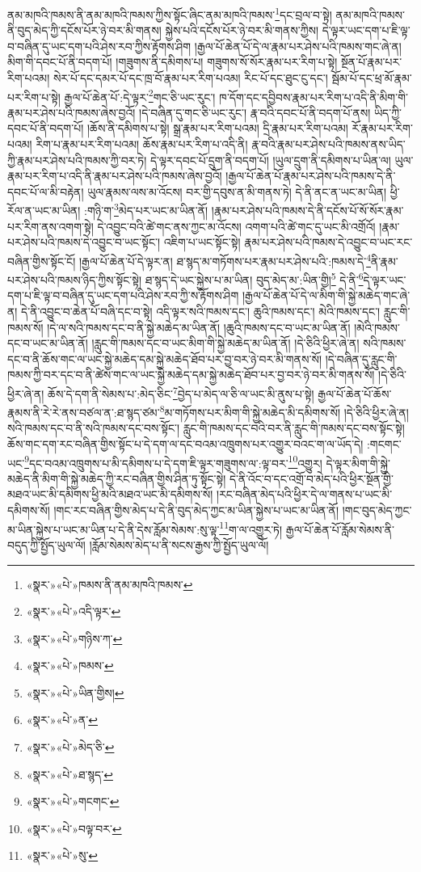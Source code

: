 ནམ་མཁའི་ཁམས་ནི་ནམ་མཁའི་ཁམས་ཀྱིས་སྟོང་ཞིང་ནམ་མཁའི་ཁམས་\footnote{«སྣར་»«པེ་»ཁམས་ནི་ནམ་མཁའི་ཁམས་}དང་བྲལ་བ་སྟེ། ནམ་མཁའི་ཁམས་ནི་བུད་མེད་ཀྱི་དངོས་པོར་ཉེ་བར་མི་གནས། སྐྱེས་པའི་དངོས་པོར་ཉེ་བར་མི་གནས་ཀྱིས། དེ་ལྟར་ཡང་དག་པ་ཇི་ལྟ་བ་བཞིན་དུ་ཡང་དག་པའི་ཤེས་རབ་ཀྱིས་རྟོགས་ཤིག །རྒྱལ་པོ་ཆེན་པོ་དེ་ལ་རྣམ་པར་ཤེས་པའི་ཁམས་གང་ཞེ་ན། མིག་གི་དབང་པོ་ནི་བདག་པོ། །གཟུགས་ནི་དམིགས་པ། གཟུགས་སོ་སོར་རྣམ་པར་རིག་པ་སྟེ། སྔོན་པོ་རྣམ་པར་རིག་པའམ། སེར་པོ་དང་དམར་པོ་དང་ཁྲ་བོ་རྣམ་པར་རིག་པའམ། རིང་པོ་དང་ཐུང་ངུ་དང་། སྦོམ་པོ་དང་ཕྲ་མོ་རྣམ་པར་རིག་པ་སྟེ། རྒྱལ་པོ་ཆེན་པོ་:དེ་ལྟར་\footnote{«སྣར་»«པེ་»འདི་ལྟར་}གང་ཅི་ཡང་རུང་། ཁ་དོག་དང་དབྱིབས་རྣམ་པར་རིག་པ་འདི་ནི་མིག་གི་རྣམ་པར་ཤེས་པའི་ཁམས་ཞེས་བྱའོ། །དེ་བཞིན་དུ་གང་ཅི་ཡང་རུང་། རྣ་བའི་དབང་པོ་ནི་བདག་པོ་ནས། ཡིད་ཀྱི་དབང་པོ་ནི་བདག་པོ། །ཆོས་ནི་དམིགས་པ་སྟེ། སྒྲ་རྣམ་པར་རིག་པའམ། དྲི་རྣམ་པར་རིག་པའམ། རོ་རྣམ་པར་རིག་པའམ། རིག་པ་རྣམ་པར་རིག་པའམ། ཆོས་རྣམ་པར་རིག་པ་འདི་ནི། རྣ་བའི་རྣམ་པར་ཤེས་པའི་ཁམས་ནས་ཡིད་ཀྱི་རྣམ་པར་ཤེས་པའི་ཁམས་ཀྱི་བར་ཏེ། དེ་ལྟར་དབང་པོ་དྲུག་ནི་བདག་པོ། །ཡུལ་དྲུག་ནི་དམིགས་པ་ཡིན་ལ། ཡུལ་རྣམ་པར་རིག་པ་འདི་ནི་རྣམ་པར་ཤེས་པའི་ཁམས་ཞེས་བྱའོ། །རྒྱལ་པོ་ཆེན་པོ་རྣམ་པར་ཤེས་པའི་ཁམས་དེ་ནི་དབང་པོ་ལ་མི་བརྟེན། ཡུལ་རྣམས་ལས་མ་འོངས། བར་གྱི་དབུས་ན་མི་གནས་ཏེ། དེ་ནི་ནང་ན་ཡང་མ་ཡིན། ཕྱི་རོལ་ན་ཡང་མ་ཡིན། :གཉི་ག་\footnote{«སྣར་»«པེ་»གཉིས་ཀ་}མེད་པར་ཡང་མ་ཡིན་ནོ། །རྣམ་པར་ཤེས་པའི་ཁམས་དེ་ནི་དངོས་པོ་སོ་སོར་རྣམ་པར་རིག་ནས་འགག་སྟེ། དེ་འབྱུང་བའི་ཚེ་གང་ནས་ཀྱང་མ་འོངས། འགག་པའི་ཚེ་གང་དུ་ཡང་མི་འགྲོའོ། །རྣམ་པར་ཤེས་པའི་ཁམས་དེ་འབྱུང་བ་ཡང་སྟོང་། འཇིག་པ་ཡང་སྟོང་སྟེ། རྣམ་པར་ཤེས་པའི་ཁམས་དེ་འབྱུང་བ་ཡང་རང་བཞིན་གྱིས་སྟོང་ངོ། །རྒྱལ་པོ་ཆེན་པོ་དེ་ལྟར་ན། ཐ་སྙད་མ་གཏོགས་པར་རྣམ་པར་ཤེས་པའི་:ཁམས་དེ་\footnote{«སྣར་»«པེ་»ཁམས་}ནི་རྣམ་པར་ཤེས་པའི་ཁམས་ཉིད་ཀྱིས་སྟོང་སྟེ། ཐ་སྙད་དེ་ཡང་སྐྱེས་པ་མ་ཡིན། བུད་མེད་མ་:ཡིན་གྱི།\footnote{«སྣར་»«པེ་»ཡིན་གྱིས།} དེ་ནི་\footnote{«སྣར་»«པེ་»ན་}དེ་ལྟར་ཡང་དག་པ་ཇི་ལྟ་བ་བཞིན་དུ་ཡང་དག་པའི་ཤེས་རབ་ཀྱི་ས་རྟོགས་ཤིག །རྒྱལ་པོ་ཆེན་པོ་དེ་ལ་མིག་གི་སྐྱེ་མཆེད་གང་ཞེ་ན། དེ་ནི་འབྱུང་བ་ཆེན་པོ་བཞི་དང་བ་སྟེ། འདི་ལྟར་སའི་ཁམས་དང་། ཆུའི་ཁམས་དང་། མེའི་ཁམས་དང་། རླུང་གི་ཁམས་སོ། །དེ་ལ་སའི་ཁམས་དང་བ་ནི་སྐྱེ་མཆེད་མ་ཡིན་ནོ། །ཆུའི་ཁམས་དང་བ་ཡང་མ་ཡིན་ནོ། །མེའི་ཁམས་དང་བ་ཡང་མ་ཡིན་ནོ། །རླུང་གི་ཁམས་དང་བ་ཡང་མིག་གི་སྐྱེ་མཆེད་མ་ཡིན་ནོ། །དེ་ཅིའི་ཕྱིར་ཞེ་ན། སའི་ཁམས་དང་བ་ནི་ཆོས་གང་ལ་ཡང་སྐྱེ་མཆེད་དམ་སྐྱེ་མཆེད་ཐོབ་པར་བྱ་བར་ཉེ་བར་མི་གནས་སོ། །དེ་བཞིན་དུ་རླུང་གི་ཁམས་ཀྱི་བར་དང་བ་ནི་ཚེས་གང་ལ་ཡང་སྐྱེ་མཆེད་དམ་སྐྱེ་མཆེད་ཐོབ་པར་བྱ་བར་ཉེ་བར་མི་གནས་སོ། །དེ་ཅིའི་ཕྱིར་ཞེ་ན། ཆོས་དེ་དག་ནི་སེམས་པ་:མེད་ཅིང་\footnote{«སྣར་»«པེ་»མེད་ཅི་}བྱེད་པ་མེད་ལ་ཅི་ལ་ཡང་མི་ནུས་པ་སྟེ། རྒྱལ་པོ་ཆེན་པོ་ཆོས་རྣམས་ནི་རེ་རེ་ནས་བཙལ་ན་:ཐ་སྙད་ཙམ་\footnote{«སྣར་»«པེ་»ཐ་སྙད་}མ་གཏོགས་པར་མིག་གི་སྐྱེ་མཆེད་མི་དམིགས་སོ། །དེ་ཅིའི་ཕྱིར་ཞེ་ན། སའི་ཁམས་དང་བ་ནི་སའི་ཁམས་དང་བས་སྟོང་། རླུང་གི་ཁམས་དང་བའི་བར་ནི་རླུང་གི་ཁམས་དང་བས་སྟོང་སྟེ། ཆོས་གང་དག་རང་བཞིན་གྱིས་སྟོང་པ་དེ་དག་ལ་དང་བའམ་འཁྲུགས་པར་འགྱུར་བའང་ག་ལ་ཡོད་དེ། :གངགང་ཡང་\footnote{«སྣར་»«པེ་»གངགང་}དང་བའམ་འཁྲུགས་པ་མི་དམིགས་པ་དེ་དག་ཇི་ལྟར་གཟུགས་ལ་:ལྟ་བར་\footnote{«སྣར་»«པེ་»བལྟ་བར་}འགྱུར། དེ་ལྟར་མིག་གི་སྐྱེ་མཆེད་ནི་མིག་གི་སྐྱེ་མཆེད་ཀྱི་རང་བཞིན་གྱིས་ཤིན་ཏུ་སྟོང་སྟེ། དེ་ནི་འོང་བ་དང་འགྲོ་བ་མེད་པའི་ཕྱིར་སྔོན་གྱི་མཐའ་ཡང་མི་དམིགས་ཕྱི་མའི་མཐའ་ཡང་མི་དམིགས་སོ། །རང་བཞིན་མེད་པའི་ཕྱིར་དེ་ལ་གནས་པ་ཡང་མི་དམིགས་སོ། །གང་རང་བཞིན་གྱིས་མེད་པ་དེ་ནི་བུད་མེད་ཀྱང་མ་ཡིན་སྐྱེས་པ་ཡང་མ་ཡིན་ནོ། །གང་བུད་མེད་ཀྱང་མ་ཡིན་སྐྱེས་པ་ཡང་མ་ཡིན་པ་དེ་ནི་དེས་རློམ་སེམས་:སུ་ལྟ་\footnote{«སྣར་»«པེ་»སུ་}ག་ལ་འགྱུར་ཏེ། རྒྱལ་པོ་ཆེན་པོ་རློམ་སེམས་ནི་བདུད་ཀྱི་སྤྱོད་ཡུལ་ལོ། །རློམ་སེམས་མེད་པ་ནི་སངས་རྒྱས་ཀྱི་སྤྱོད་ཡུལ་ལོ། 